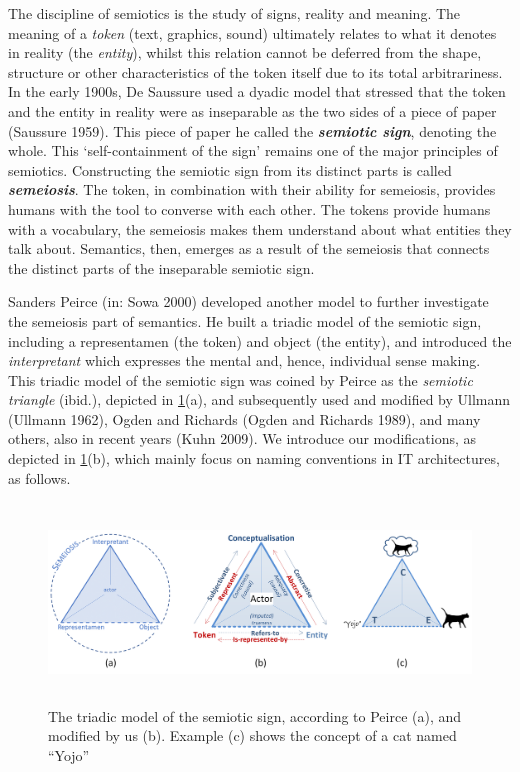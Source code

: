 \documentclass[a4paper,11pt,oneside,oldfontcommands]{memoir}
\newcounter{para}
\theoremstyle{definition}
\theoremstyle{break}		%
\numberwithin{equation}{chapter}
\numberwithin{figure}{chapter}
\begin{document}
The discipline of semiotics is the study of signs, reality and meaning.
The meaning of a \emph{token} (text, graphics, sound) ultimately relates
to what it denotes in reality (the \emph{entity}), whilst this relation
cannot be deferred from the shape, structure or other characteristics of
the token itself due to its total arbitrariness. In the early 1900s, De
Saussure used a dyadic model that stressed that the token and the entity
in reality were as inseparable as the two sides of a piece of paper
(Saussure 1959). This piece of paper he called the
\textbf{\emph{semiotic sign}}, denoting the whole. This
`self-containment of the sign' remains one of the major principles of
semiotics. Constructing the semiotic sign from its distinct parts is
called \textbf{\emph{semeiosis}}. The token, in combination with their
ability for semeiosis, provides humans with the tool to converse with
each other. The tokens provide humans with a vocabulary, the semeiosis
makes them understand about what entities they talk about. Semantics,
then, emerges as a result of the semeiosis that connects the distinct
parts of the inseparable semiotic sign.

Sanders Peirce (in: Sowa 2000) developed another model to further
investigate the semeiosis part of semantics. He built a triadic model of
the semiotic sign, including a representamen (the token) and object (the
entity), and introduced the \emph{interpretant} which expresses the
mental and, hence, individual sense making. This triadic model of the
semiotic sign was coined by Peirce as the \emph{semiotic triangle}
(ibid.), depicted in \cref{fig:semiotic-triangles}(a), and subsequently
used and modified by Ullmann (Ullmann 1962), Ogden and Richards (Ogden
and Richards 1989), and many others, also in recent years (Kuhn 2009).
We introduce our modifications, as depicted in
\cref{fig:semiotic-triangles}(b), which mainly focus on naming
conventions in IT architectures, as follows.

\begin{figure}
\hypertarget{fig:semiotic-triangles}{%
\centering
\includegraphics[width=6.25in,height=2.08333in]{src/images/SemioticTriangles.png}
\caption{The triadic model of the semiotic sign, according to Peirce
(a), and modified by us (b). Example (c) shows the concept of a cat
named ``Yojo''}\label{fig:semiotic-triangles}
}
\end{figure}
\end{document}
